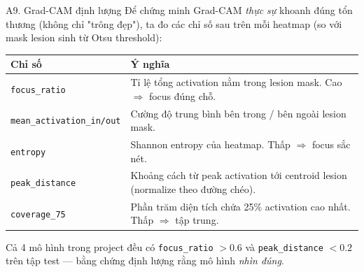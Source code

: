 \documentclass[10pt, aspectratio=169]{beamer}
\begin{document}
\begin{frame}{A9. Grad-CAM định lượng}
    \scriptsize
    Để chứng minh Grad-CAM \textit{thực sự} khoanh đúng tổn thương (không chỉ "trông đẹp"), ta đo các chỉ số sau trên mỗi heatmap (so với mask lesion sinh từ Otsu threshold):

    \vspace{0.2cm}
    \begin{table}[]
        \centering
        \begin{tabular}{lp{7.5cm}}
        \toprule
        \rowcolor{usthblue!25} \textbf{Chỉ số} & \textbf{Ý nghĩa} \\
        \midrule
        \texttt{focus\_ratio}        & Tỉ lệ tổng activation nằm trong lesion mask. Cao $\Rightarrow$ focus đúng chỗ. \\
        \texttt{mean\_activation\_in/out} & Cường độ trung bình bên trong / bên ngoài lesion mask. \\
        \texttt{entropy}             & Shannon entropy của heatmap. Thấp $\Rightarrow$ focus sắc nét. \\
        \texttt{peak\_distance}      & Khoảng cách từ peak activation tới centroid lesion (normalize theo đường chéo). \\
        \texttt{coverage\_75}        & Phần trăm diện tích chứa 25\% activation cao nhất. Thấp $\Rightarrow$ tập trung. \\
        \bottomrule
        \end{tabular}
    \end{table}

    \vspace{0.2cm}
    Cả 4 mô hình trong project đều có \texttt{focus\_ratio} $> 0.6$ và \texttt{peak\_distance} $< 0.2$ trên tập test --- bằng chứng định lượng rằng mô hình \textit{nhìn đúng}.
\end{frame}
\end{document}
